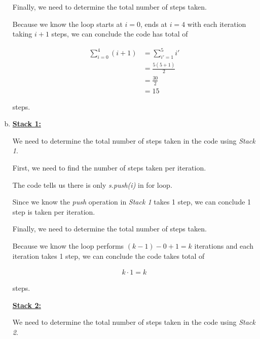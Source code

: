 \documentclass[12pt]{article}
\begin{document}
\begin{enumerate}[a.]
    Finally, we need to determine the total number of steps taken.

    \bigskip

    Because we know the loop starts at $i = 0$, ends at $i = 4$ with each iteration
    taking $i+1$ steps, we can conclude the code has total of

    \setcounter{equation}{0}
    \begin{align}
        \sum\limits_{i=0}^4 (i+1) &= \sum\limits_{i'=1}^5 i'\\
        &= \frac{5(5+1)}{2}\\
        &= \frac{30}{2}\\
        &= 15
    \end{align}

    steps.


    \item

    \underline{\textbf{Stack 1:}}

    \bigskip

    We need to determine the total number of steps taken in the code using \textit{Stack 1}.

    \bigskip

    First, we need to find the number of steps taken per iteration.

    \bigskip

    The code tells us there is only \textit{s.push(i)} in for loop.

    \bigskip

    Since we know the \textit{push} operation in \textit{Stack 1} takes 1 step,
    we can conclude 1 step is taken per iteration.

    \bigskip

    Finally, we need to determine the total number of steps taken.

    \bigskip

    Because we know the loop performs $(k-1) - 0 + 1 = k$ iterations and each
    iteration takes 1 step, we can conclude the code takes total of

    \begin{align}
        k \cdot 1 = k
    \end{align}

    steps.

    \bigskip

    \underline{\textbf{Stack 2:}}

    \bigskip

    We need to determine the total number of steps taken in the code using \textit{Stack 2}.


\end{enumerate}
\end{document}
